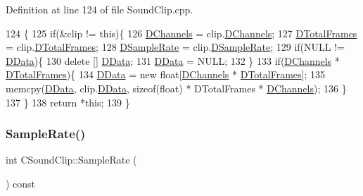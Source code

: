 Definition at line 124 of file Sound\+Clip.\+cpp.


\begin{DoxyCode}
124                                                        \{
125     \textcolor{keywordflow}{if}(&clip != \textcolor{keyword}{this})\{
126         \hyperlink{classCSoundClip_a01aaf0b87b9b8226c77a6931d03d6a64}{DChannels} = clip.\hyperlink{classCSoundClip_a01aaf0b87b9b8226c77a6931d03d6a64}{DChannels};
127         \hyperlink{classCSoundClip_ab0d9eb261d09fa2a106658276f37285b}{DTotalFrames} = clip.\hyperlink{classCSoundClip_ab0d9eb261d09fa2a106658276f37285b}{DTotalFrames};
128         \hyperlink{classCSoundClip_ac1b9306140da2f89f6178833e0a9b887}{DSampleRate} = clip.\hyperlink{classCSoundClip_ac1b9306140da2f89f6178833e0a9b887}{DSampleRate};
129         \textcolor{keywordflow}{if}(NULL != \hyperlink{classCSoundClip_a220921a0c81e5c63e2cd3c55c75878b1}{DData})\{
130             \textcolor{keyword}{delete} [] \hyperlink{classCSoundClip_a220921a0c81e5c63e2cd3c55c75878b1}{DData};
131             \hyperlink{classCSoundClip_a220921a0c81e5c63e2cd3c55c75878b1}{DData} = NULL;
132         \}
133         \textcolor{keywordflow}{if}(\hyperlink{classCSoundClip_a01aaf0b87b9b8226c77a6931d03d6a64}{DChannels} * \hyperlink{classCSoundClip_ab0d9eb261d09fa2a106658276f37285b}{DTotalFrames})\{
134             \hyperlink{classCSoundClip_a220921a0c81e5c63e2cd3c55c75878b1}{DData} = \textcolor{keyword}{new} \textcolor{keywordtype}{float}[\hyperlink{classCSoundClip_a01aaf0b87b9b8226c77a6931d03d6a64}{DChannels} * \hyperlink{classCSoundClip_ab0d9eb261d09fa2a106658276f37285b}{DTotalFrames}];
135             memcpy(\hyperlink{classCSoundClip_a220921a0c81e5c63e2cd3c55c75878b1}{DData}, clip.\hyperlink{classCSoundClip_a220921a0c81e5c63e2cd3c55c75878b1}{DData}, \textcolor{keyword}{sizeof}(\textcolor{keywordtype}{float}) * DTotalFrames * 
      \hyperlink{classCSoundClip_a01aaf0b87b9b8226c77a6931d03d6a64}{DChannels});
136         \}
137     \}
138     \textcolor{keywordflow}{return} *\textcolor{keyword}{this};
139 \}
\end{DoxyCode}
\hypertarget{classCSoundClip_ac89dc3d2f25a43fcd97268ec9828f709}{}\label{classCSoundClip_ac89dc3d2f25a43fcd97268ec9828f709} 
\subsubsection{\texorpdfstring{Sample\+Rate()}{SampleRate()}}
{\footnotesize\ttfamily int C\+Sound\+Clip\+::\+Sample\+Rate (\begin{DoxyParamCaption}{ }\end{DoxyParamCaption}) const\hspace{0.3cm}{\ttfamily [inline]}}



